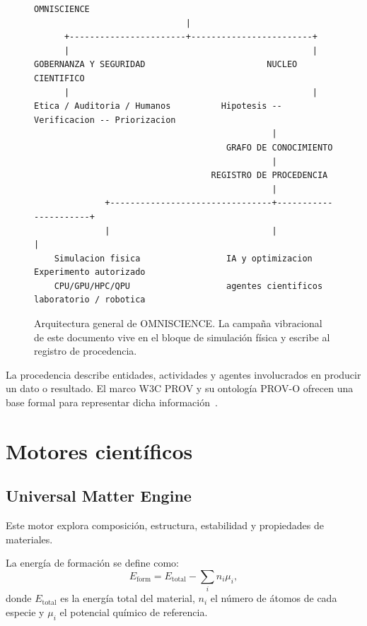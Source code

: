 \documentclass[11pt,a4paper]{article}
\newcommand{\Eform}{E_{\mathrm{form}}}
\begin{document}
\begin{figure}[H]
\centering
\begin{lstlisting}[basicstyle=\ttfamily\footnotesize]
                         OMNISCIENCE
                              |
      +-----------------------+------------------------+
      |                                                |
GOBERNANZA Y SEGURIDAD                        NUCLEO CIENTIFICO
      |                                                |
Etica / Auditoria / Humanos          Hipotesis -- Verificacion -- Priorizacion
                                               |
                                      GRAFO DE CONOCIMIENTO
                                               |
                                   REGISTRO DE PROCEDENCIA
                                               |
              +--------------------------------+----------------------+
              |                                |                      |
    Simulacion fisica                 IA y optimizacion      Experimento autorizado
    CPU/GPU/HPC/QPU                   agentes cientificos     laboratorio / robotica
\end{lstlisting}
\caption{Arquitectura general de OMNISCIENCE. La campaña vibracional de este documento vive en el bloque de simulación física y escribe al registro de procedencia.}
\label{fig:arquitectura}
\end{figure}

La procedencia describe entidades, actividades y agentes involucrados en producir un dato o resultado. El marco W3C PROV y su ontología PROV-O ofrecen una base formal para representar dicha información~\cite{prov_overview,prov_o}.

\section{Motores científicos}

\subsection{Universal Matter Engine}

Este motor explora composición, estructura, estabilidad y propiedades de materiales.

La energía de formación se define como:
\begin{equation}
\Eform =
E_{\mathrm{total}}
-
\sum_i n_i \mu_i,
\end{equation}
donde $E_{\mathrm{total}}$ es la energía total del material, $n_i$ el número de átomos de cada especie y $\mu_i$ el potencial químico de referencia.
\end{document}

